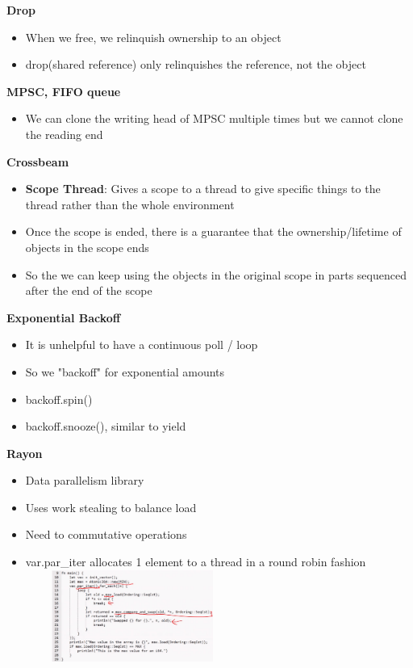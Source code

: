 \documentclass[10pt, landscape]{article}
\begin{document}
\begin{multicols}{4}
\textbf{Drop} \\
\begin{itemize}
    \item When we free, we relinquish ownership to an object 
    \item drop(shared reference) only relinquishes the reference, not the object
\end{itemize}

\textbf{MPSC, FIFO queue} \\
\begin{itemize}
    \item We can clone the writing head of MPSC multiple times but we cannot clone the reading end  
\end{itemize}

\textbf{Crossbeam} \\ 
\begin{itemize}
    \item \textbf{Scope Thread}: Gives a scope to a thread to give specific things to the thread rather than the whole environment
    \item Once the scope is ended, there is a guarantee that the ownership/lifetime of objects in the scope ends
    \item So the we can keep using the objects in the original scope in parts sequenced after the end of the scope 
\end{itemize}

\textbf{Exponential Backoff} \\ 
\begin{itemize}
    \item It is unhelpful to have a continuous poll / loop 
    \item So we "backoff" for exponential amounts
    \item backoff.spin()
    \item backoff.snooze(), similar to yield
\end{itemize}

\textbf{Rayon} \\
\begin{itemize}
    \item Data parallelism library
    \item Uses work stealing to balance load
    \item Need to commutative operations 
    \item var.par\_iter allocates 1 element to a thread in a round robin fashion
    \includegraphics*[width=7cm,height=3cm]{rayon.png}
\end{itemize}


\end{multicols}
\end{document}
